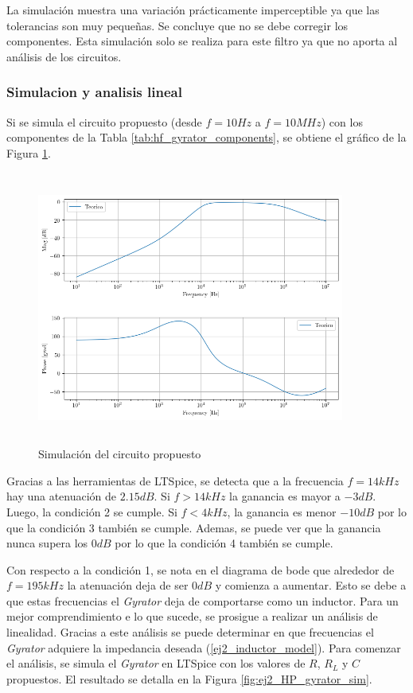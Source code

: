 \documentclass[12pt,a4paper]{article}
\begin{document}
La simulación muestra una variación prácticamente imperceptible ya que las tolerancias son muy pequeñas. Se concluye que no se debe corregir los componentes. Esta simulación solo se realiza para este filtro ya que no aporta al análisis de los circuitos. 

\subsubsection{Simulacion y analisis lineal}
Si se simula el circuito propuesto (desde $f = 10 Hz$ a $f = 10MHz$) con los componentes de la Tabla \ref{tab:hf_gyrator_components}, se obtiene el gráfico de la Figura \ref{ej2_hp_sim}.

\begin{figure}[h!]                                                       
    \centering\includegraphics[width=0.9\textwidth, height=9cm]{Resources/ej2_hp_sim.png}
    \caption{Simulación del circuito propuesto }
    \label{ej2_hp_sim}
    \end{figure}

Gracias a las herramientas de LTSpice, se detecta que a la frecuencia $f = 14kHz$ hay una atenuación de $2.15 dB$. Si $f > 14kHz$ la ganancia es mayor a $-3dB$. Luego, la condición 2 se cumple. Si $f < 4kHz$, la ganancia es menor $-10dB$ por lo que la condición 3 también se cumple. Ademas, se puede ver que la ganancia nunca supera los $0dB$ por lo que la condición 4 también se cumple. 

Con respecto a la condición 1, se nota en el diagrama de bode que alrededor de $f = 195 kHz$ la atenuación deja de ser $0dB$ y comienza a aumentar. Esto se debe a que estas frecuencias el \textit{Gyrator} deja de comportarse como un inductor. Para un mejor comprendimiento e lo que sucede, se prosigue a realizar un análisis de linealidad. Gracias a este análisis se puede determinar en que frecuencias el \textit{Gyrator} adquiere la impedancia deseada (\ref{ej2_inductor_model}). Para comenzar el análisis, se simula el \textit{Gyrator} en LTSpice con los valores de $R$, $R_L$ y $C$ propuestos. El resultado se detalla en la Figura \ref{fig:ej2_HP_gyrator_sim}.
\end{document}
